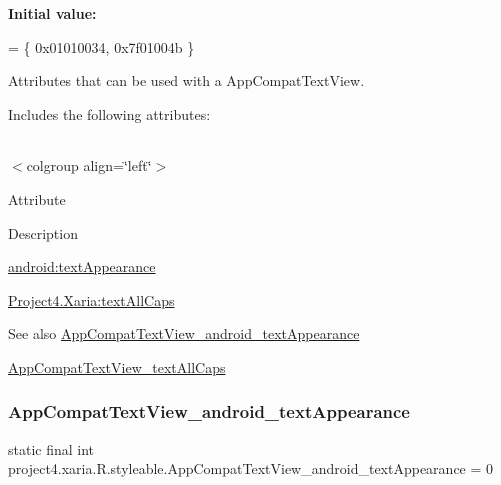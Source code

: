 {\bfseries Initial value\+:}
\begin{DoxyCode}
= \{
            0x01010034, 0x7f01004b
        \}
\end{DoxyCode}
Attributes that can be used with a App\+Compat\+Text\+View. 

Includes the following attributes\+:

\tabulinesep=1mm
\begin{longtabu} spread 0pt [c]{*{0}{|X[-1]}|}
\hline
\end{longtabu}
$<$colgroup align=\char`\"{}left\char`\"{}$>$ 

Attribute

Description 

{\ttfamily \hyperlink{classproject4_1_1xaria_1_1R_1_1styleable_a529b42ceaf669fb07a434fd12c08787d}{android\+:text\+Appearance}}

{\ttfamily \hyperlink{classproject4_1_1xaria_1_1R_1_1styleable_a6cae197d9bb81d300174304d1eaaa5cd}{Project4.\+Xaria\+:text\+All\+Caps}}

\begin{DoxySeeAlso}{See also}
\hyperlink{classproject4_1_1xaria_1_1R_1_1styleable_a529b42ceaf669fb07a434fd12c08787d}{App\+Compat\+Text\+View\+\_\+android\+\_\+text\+Appearance} 

\hyperlink{classproject4_1_1xaria_1_1R_1_1styleable_a6cae197d9bb81d300174304d1eaaa5cd}{App\+Compat\+Text\+View\+\_\+text\+All\+Caps} 
\end{DoxySeeAlso}
\mbox{\label{classproject4_1_1xaria_1_1R_1_1styleable_a529b42ceaf669fb07a434fd12c08787d}} 
\subsubsection{\texorpdfstring{App\+Compat\+Text\+View\+\_\+android\+\_\+text\+Appearance}{AppCompatTextView\_android\_textAppearance}}
{\footnotesize\ttfamily static final int project4.\+xaria.\+R.\+styleable.\+App\+Compat\+Text\+View\+\_\+android\+\_\+text\+Appearance = 0\hspace{0.3cm}{\ttfamily [static]}}

